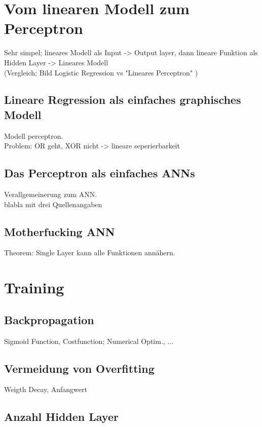 
\section{Vom linearen Modell zum Perceptron}

Sehr simpel; lineares Modell als Input -> Output layer,
dann lineare Funktion als Hidden Layer -> Lineares Modell \\
(Vergleich; Bild Logistic Regression vs "Lineares Perceptron" )

\subsection{Lineare Regression als einfaches graphisches Modell}

Modell perceptron. \\Problem: OR geht, XOR nicht -> lineare seperierbarkeit

\subsection{Das Perceptron als einfaches ANNs}

Verallgemeinerung zum ANN. \\
blabla mit drei Quellenangaben\cite{ietf-ipfix-protocol,snoeren2001hash,belenky2003ip}

\subsection{Motherfucking ANN}
Theorem: Single Layer kann alle Funktionen annähern.

\section{Training} %

\subsection{Backpropagation}
Sigmoid Function, Costfunction; Numerical Optim., 
...
\subsection{Vermeidung von Overfitting}

Weigth Decay, Anfangwert

\subsection{Anzahl Hidden Layer}

